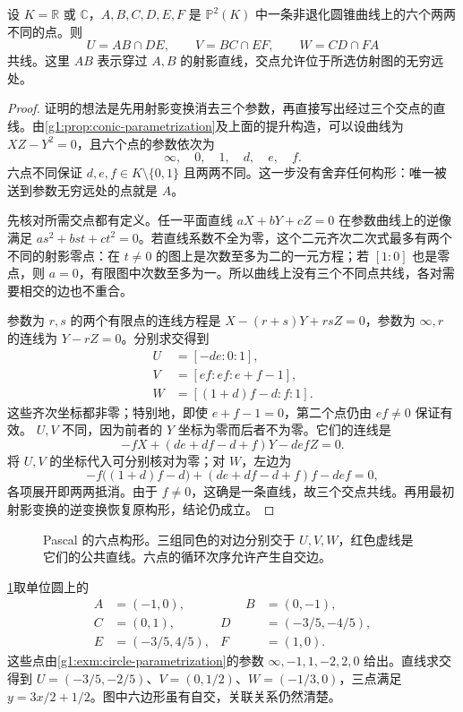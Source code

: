 \begin{theorem}\label{g1:thm:pascal}
	设 \(K=\mathbb R\) 或 \(\mathbb C\)，\(A,B,C,D,E,F\) 是 \(\mathbb P^2(K)\) 中一条非退化圆锥曲线上的六个两两不同的点。则
	\[
		U=AB\cap DE,\qquad V=BC\cap EF,\qquad W=CD\cap FA
	\]
	共线。这里 \(AB\) 表示穿过 \(A,B\) 的射影直线，交点允许位于所选仿射图的无穷远处。
\end{theorem}
\begin{proof}
	证明的想法是先用射影变换消去三个参数，再直接写出经过三个交点的直线。由\cref{g1:prop:conic-parametrization}及上面的提升构造，可以设曲线为 \(XZ-Y^2=0\)，且六个点的参数依次为
	\[
		\infty,\quad0,\quad1,\quad d,\quad e,\quad f.
	\]
	六点不同保证 \(d,e,f\in K\setminus\{0,1\}\) 且两两不同。这一步没有舍弃任何构形：唯一被送到参数无穷远处的点就是 \(A\)。

	先核对所需交点都有定义。任一平面直线 \(aX+bY+cZ=0\) 在参数曲线上的逆像满足 \(as^2+bst+ct^2=0\)。若直线系数不全为零，这个二元齐次二次式最多有两个不同的射影零点：在 \(t\ne0\) 的图上是次数至多为二的一元方程；若 \([1:0]\) 也是零点，则 \(a=0\)，有限图中次数至多为一。所以曲线上没有三个不同点共线，各对需要相交的边也不重合。

	参数为 \(r,s\) 的两个有限点的连线方程是 \(X-(r+s)Y+rsZ=0\)，参数为 \(\infty,r\) 的连线为 \(Y-rZ=0\)。分别求交得到
	\[
		\begin{aligned}
			U&=[-de:0:1],\\
			V&=[ef:ef:e+f-1],\\
			W&=[(1+d)f-d:f:1].
		\end{aligned}
	\]
	这些齐次坐标都非零；特别地，即使 \(e+f-1=0\)，第二个点仍由 \(ef\ne0\) 保证有效。 \(U,V\) 不同，因为前者的 \(Y\) 坐标为零而后者不为零。它们的连线是
	\begin{equation}\label{g1:eq:pascal-line}
		-fX+(de+df-d+f)Y-defZ=0.
	\end{equation}
	将 \(U,V\) 的坐标代入可分别核对为零；对 \(W\)，左边为
	\[
		-f\bigl((1+d)f-d\bigr)+(de+df-d+f)f-def=0,
	\]
	各项展开即两两抵消。由于 \(f\ne0\)，这确是一条直线，故三个交点共线。再用最初射影变换的逆变换恢复原构形，结论仍成立。
\end{proof}

\begin{figure}[htbp]
	\centering
	
	\caption[Pascal 的六点构形]{Pascal 的六点构形。三组同色的对边分别交于 \(U,V,W\)，红色虚线是它们的公共直线。六点的循环次序允许产生自交边。}
	\label{g1:fig:pascal}
\end{figure}

\cref{g1:fig:pascal}取单位圆上的
\[
	\begin{aligned}
		A&=(-1,0),&\qquad B&=(0,-1),\\
		C&=(0,1),& D&=(-3/5,-4/5),\\
		E&=(-3/5,4/5),& F&=(1,0).
	\end{aligned}
\]
这些点由\cref{g1:exm:circle-parametrization}的参数 \(\infty,-1,1,-2,2,0\) 给出。直线求交得到 \(U=(-3/5,-2/5)\)、\(V=(0,1/2)\)、\(W=(-1/3,0)\)，三点满足 \(y=3x/2+1/2\)。图中六边形虽有自交，关联关系仍然清楚。

